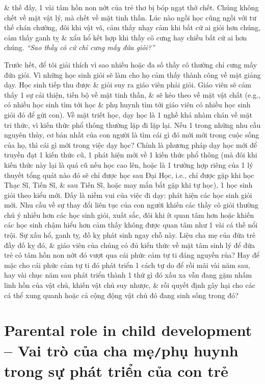 \documentclass[12pt,twoside]{book}
\begin{document}
\& thế đấy, 1 vài tâm hồn non nớt của trẻ thơ bị bóp ngạt thở chết. Chúng không chết về mặt vật lý, mà chết về mặt tinh thần. Lúc nào ngồi học cũng ngồi với tư thế chán chường, đôi khi vật vã, cảm thấy nhạy cảm khi bất cứ ai giỏi hơn chúng, cảm thấy ganh tỵ \& xẩu hổ kết hợp khi thầy cô cưng hay chiều bất cứ ai hơn chúng. {\it``Sao thầy cô cứ chỉ cưng mấy đứa giỏi?''}

Trước hết, để tôi giải thích vì sao nhiều hoặc đa số thầy cô thường chỉ cưng mấy đứa giỏi. Vì những học sinh giỏi sẽ làm cho họ cảm thấy thành công về mặt giảng dạy. Học sinh tiếp thu được \& giỏi suy ra giáo viên phải giỏi. Giáo viên sẽ cảm thấy 1 sự cải thiện, tiến bộ về mặt tinh thần, \& sẽ kéo theo về mặt vật chất (e.g., có nhiều học sinh tìm tới học \& phụ huynh tìm tới giáo viên có nhiều học sinh giỏi đó để gửi con). Về mặt triết học, dạy học là 1 nghề khá nhàm chán về mặt tri thức, vì kiến thức phổ thông thường lặp đi lặp lại. Nếu 1 trong những nhu cầu nguyên thủy, cơ bản nhất của con người là tìm cái gì đó mới mới trong cuộc sống của họ, thì cái gì mới trong việc dạy học? Chính là phương pháp dạy học mới để truyền đạt 1 kiến thức cũ, 1 phát hiện mới về 1 kiến thức phổ thông (mà đôi khi kiến thức này lại là quá cũ nếu học cao lên, hoặc là 1 trường hợp riêng của 1 lý thuyết tổng quát nào đó sẽ chỉ được học sau Đại Học, i.e., chỉ được gặp khi học Thạc Sĩ, Tiến Sĩ, \& sau Tiến Sĩ, hoặc may mắn bắt gặp khi tự học), 1 học sinh giỏi theo kiểu mới. Đấy là niềm vui của việc đi dạy: phát hiện các học sinh giỏi mới. Nhu cầu về sự thay đổi liên tục của con người khiến các thầy cô giỏi thường chú ý nhiều hơn các học sinh giỏi, xuất sắc, đôi khi ít quan tâm hơn hoặc khiến các học sinh chậm hiểu hơn cảm thấy không được quan tâm như 1 vài cá thế nổi trội. Sự xấu hổ, ganh tỵ, đố kỵ phát sinh ngay chỗ này. Liệu cha mẹ của đứa trẻ đầy đố kỵ đó, \& giáo viên của chúng có đủ kiến thức về mặt tâm sinh lý để đứa trẻ có tâm hồn non nớt đó vượt qua cái phức cảm tự ti đáng nguyền rủa? Hay để mặc cho cái phức cảm tự ti đó phát triển 1 cách tự do để rồi mãi vài năm sau, hay vài chục năm sau phát triển thành 1 thứ gì đó xấu xa vẫn đang gặm nhấm linh hồn của vật chủ, khiến vật chủ suy nhược, \& rồi quyết định gây hại cho các cá thể xung quanh hoặc cả cộng động vật chủ đó đang sinh sống trong đó?
	

\section{Parental role in child development -- Vai trò của cha mẹ{\tt/}phụ huynh trong sự phát triển của con trẻ}
\end{document}
